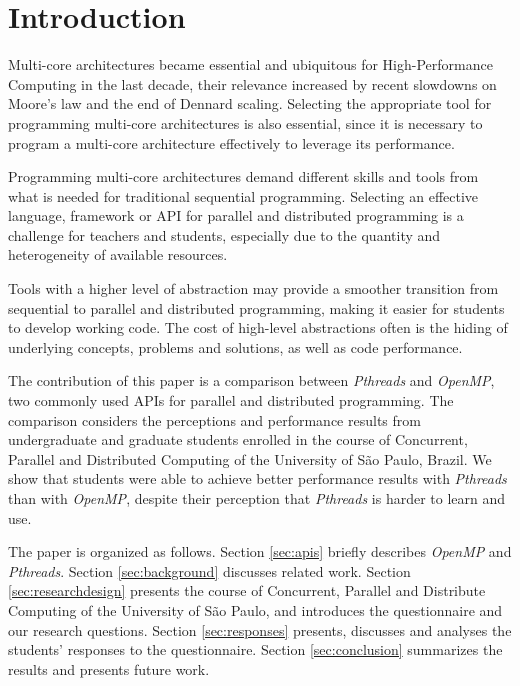 \section{Introduction}
\label{sec:introduction}

Multi-core architectures became essential and ubiquitous for High-Performance
Computing in the last decade, their relevance increased by recent slowdowns on
Moore's law and the end of Dennard scaling.  Selecting the appropriate tool for
programming multi-core architectures is also essential, since it is necessary
to program a multi-core architecture effectively to leverage its performance.

Programming multi-core architectures demand different skills and tools from
what is needed for traditional sequential programming. Selecting an effective
language, framework or API for parallel and distributed programming is a
challenge for teachers and students, especially due to the quantity and
heterogeneity of available resources.

Tools with a higher level of abstraction may provide a smoother transition from
sequential to parallel and distributed programming, making it easier for
students to develop working code. The cost of high-level abstractions often is
the hiding of underlying concepts, problems and solutions, as well as code
performance.

The contribution of this paper is a comparison between \textit{Pthreads} and
\textit{OpenMP}, two commonly used APIs for parallel and distributed
programming.  The comparison considers the perceptions and performance results
from undergraduate and graduate students enrolled in the course of Concurrent,
Parallel and Distributed Computing of the University of São Paulo, Brazil.  We
show that students were able to achieve better performance results with
\textit{Pthreads} than with \textit{OpenMP}, despite their perception
that \textit{Pthreads} is harder to learn and use.

The paper is organized as follows.
Section \ref{sec:apis} briefly describes \textit{OpenMP} and \textit{Pthreads}.
Section \ref{sec:background} discusses related work.
Section \ref{sec:researchdesign} presents the course of
Concurrent, Parallel and Distribute Computing of the University
of São Paulo, and introduces the questionnaire and our research
questions.
Section \ref{sec:responses} presents, discusses and analyses
the students' responses to the questionnaire.
Section \ref{sec:conclusion} summarizes the results and
presents future work.
